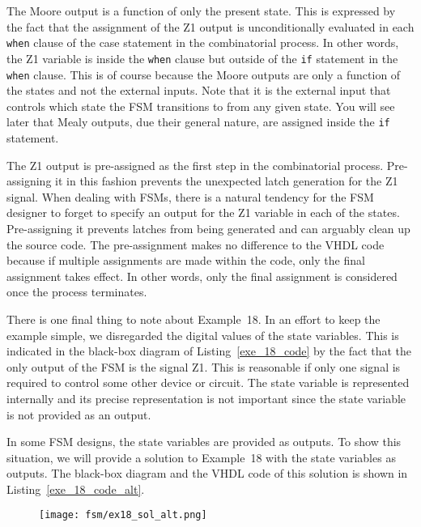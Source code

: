 \begin{my_list}
\item The Moore output is a function of only the present state. This is expressed by the fact that the assignment of the Z1 output is unconditionally evaluated in each \texttt{when} clause of the case statement in the combinatorial process. In other words, the Z1 variable is inside the \texttt{when} clause but outside of the \texttt{if} statement in the \texttt{when} clause. This is of course because the Moore outputs are only a function of the states and not the external inputs. Note that it is the external input that controls which state the FSM transitions to from any given state. You will see later that Mealy outputs, due their general nature, are assigned inside the \texttt{if} statement.

\item The Z1 output is pre-assigned as the first step in the combinatorial process. Pre-assigning it in this fashion prevents the unexpected latch generation for the Z1 signal. When dealing with FSMs, there is a natural tendency for the FSM designer to forget to specify an output for the Z1 variable in each of the states. Pre-assigning it prevents latches from being generated and can arguably clean up the source code. The pre-assignment makes no difference to the VHDL code because if multiple assignments are made within the code, only the final assignment takes effect. In other words, only the final assignment is considered once the process terminates.
\end{my_list}

There is one final thing to note about Example~18. In an effort to keep the example simple, we disregarded the digital values of the state variables. This is indicated in the black-box diagram of Listing~\ref{exe_18_code} by the fact that the only output of the FSM is the signal Z1. This is reasonable if only one signal is required to control some other device or circuit. The state variable is represented internally and its precise representation is not important since the state variable is not provided as an output.

In some FSM designs, the state variables are provided as outputs. To show this situation, we will provide a solution to Example~18 with the state variables as outputs. The black-box diagram and the VHDL code of this solution is shown in Listing~\ref{exe_18_code_alt}.
\begin{figure}[!h]
    \centering
	\texttt{[image: fsm/ex18\_sol\_alt.png]}
\end{figure}

